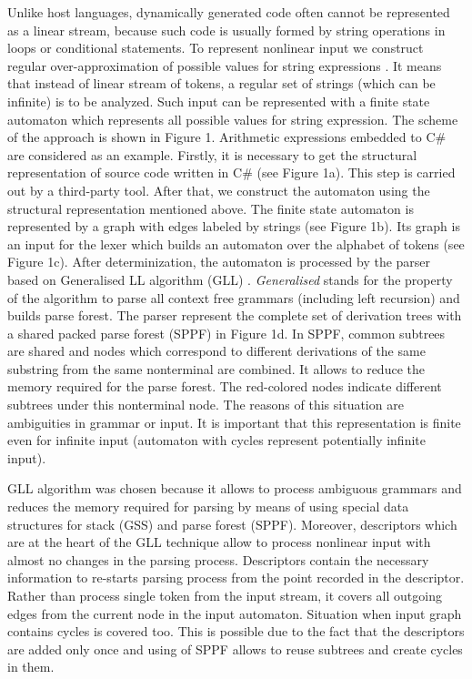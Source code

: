 \documentclass{sig-alternate} %
\begin{document}
Unlike host languages, dynamically generated code often cannot be represented as a linear stream, because such
code is usually formed by string operations in loops or conditional statements. To represent nonlinear input we
construct regular over-approximation of possible values for string expressions \cite{Fang Yu}. It
means that instead of linear stream of tokens, a regular set of strings (which can be infinite) is to be
analyzed. Such input can be represented with a finite state automaton which represents all possible values for
string expression. The scheme of the approach is shown in Figure 1. Arithmetic expressions embedded to C\# are
considered as an example. Firstly, it is necessary to get the structural representation of source code written
in C\# (see Figure 1a). This step is carried out by a third-party tool. After that, we construct the automaton
using the structural representation mentioned above. The finite state automaton is represented by a graph with
edges labeled by strings (see Figure 1b). Its graph is an input for the lexer which builds an automaton over
the alphabet of tokens (see Figure 1c). After determinization, the automaton is processed by the parser based
on Generalised LL algorithm (GLL) \cite{GLL}. \textit{Generalised} stands for the property of the algorithm to parse all
context free grammars (including left recursion) and builds parse forest. The parser represent the complete set of derivation trees with a shared packed parse forest (SPPF) \cite{SPPF} in Figure 1d. In SPPF, common subtrees are shared and nodes which correspond to different derivations of the same substring from the same nonterminal are combined. It
allows to reduce the memory required for the parse forest. The red-colored nodes indicate different
subtrees under this nonterminal node. The reasons of this situation are ambiguities in grammar or input. It is
important that this representation is finite even for infinite input (automaton with cycles represent potentially 
infinite input). 

GLL algorithm was chosen because it allows to process ambiguous grammars and reduces the memory required for parsing
by means of using special data structures for stack (GSS) and parse forest (SPPF). Moreover, descriptors which are at the
heart of the GLL technique allow to process nonlinear input with almost no changes in the parsing process. Descriptors
contain the necessary information to re-starts parsing process from the point recorded in the descriptor. Rather than
process single token from the input stream, it covers all outgoing edges from the current node in the input automaton.
Situation when input graph contains cycles is covered too. This is possible due to the fact that the descriptors are
added only once and using of SPPF allows to reuse subtrees and create cycles in them.
\end{document}
